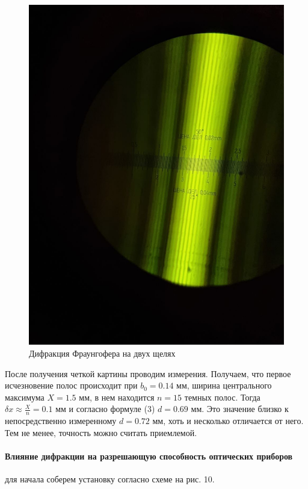 \documentclass[a4paper,12pt]{article}
\begin{document}
\begin{figure}[H]
    \centering
    \includegraphics[scale=0.2]{pic_5.png}
    \caption{Дифракция Фраунгофера на двух щелях}
\end{figure}

\noindent
После получения четкой картины проводим измерения. Получаем, что первое исчезновение полос происходит при $b_0 = 0.14$ мм, ширина центрального максимума $X = 1.5$ мм, в нем находится $n = 15$ темных полос. Тогда $\delta x \approx \frac{X}{n} = 0.1$ мм и согласно формуле (3) $d = 0.69$ мм. Это значение близко к непосредственно измеренному $d = 0.72$ мм, хоть и несколько отличается от него. Тем не менее, точность можно считать приемлемой.

\paragraph{Влияние дифракции на разрешающую способность оптических приборов} для начала соберем установку согласно схеме на рис. 10.
\end{document}

